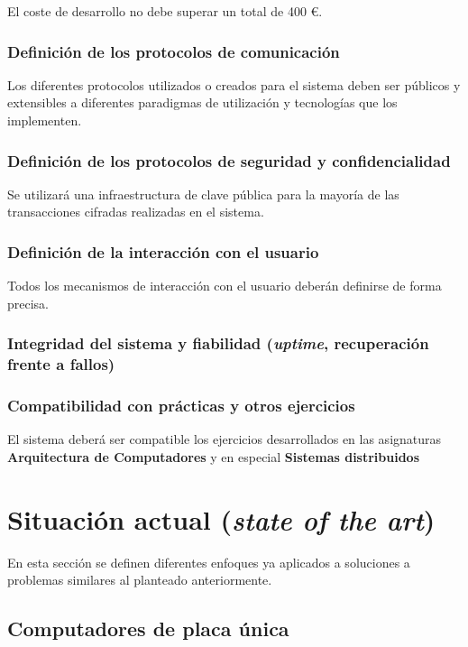 El coste de desarrollo no debe superar un total de 400 €.

\subsubsection{Definición de los protocolos de comunicación}

Los diferentes protocolos utilizados o creados para el sistema deben ser públicos y extensibles a diferentes paradigmas de utilización y tecnologías que los implementen.

\subsubsection{Definición de los protocolos de seguridad y confidencialidad}

Se utilizará una infraestructura de clave pública para la mayoría de las transacciones cifradas realizadas en el sistema.

\subsubsection{Definición de la interacción con el usuario}

Todos los mecanismos de interacción con el usuario deberán definirse de forma precisa.

\subsubsection{Integridad del sistema y fiabilidad (\textit{uptime}, recuperación frente a fallos)}

\subsubsection{Compatibilidad con prácticas y otros ejercicios}

El sistema deberá ser compatible los ejercicios desarrollados en las asignaturas \textbf{Arquitectura de Computadores} y en especial \textbf{Sistemas distribuidos}

\section{Situación actual (\textit{state of the art})}
\label{stateoftheart}
En esta sección se definen diferentes enfoques ya aplicados a soluciones a problemas similares al planteado anteriormente.

\subsection{Computadores de placa única}

